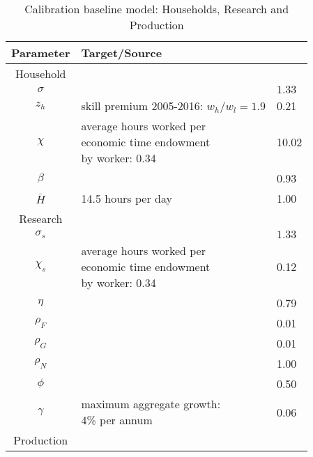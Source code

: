  \begin{table}[h!]
 	\begin{center}
 		\captionsetup{width=0.9\textwidth}
 		\caption{ Calibration baseline model: Households, Research and Production}
 		\label{tab:calib}
 		\begin{tabular}{c|ll}
 			\hline \hline
 			Parameter& Target/Source& \makecell[l]{Calibration}\\ 
 			\hline
 			\hline
 			Household&\multicolumn{2}{c}{}\\
 			\hline 
 			
 			\hline
 			$\sigma$ &  \makecell[l]{\cite{Chetty2011AreMargins}}& $1.33$  \\
 			$z_h$& \makecell[l]{skill premium 2005-2016:\\ $w_h/w_l=1.9$\\ \citep{Slavik2020WagePremium}}&0.21\\	
 			$\chi$ &  \makecell[l]{average hours worked per\\ economic time endowment\\ by worker: 0.34 \cite{OECDHoursworked}}& 10.02 \\
 			$\beta$ &  \makecell[l]{\cite{Barrage2019OptimalPolicy}}& 0.93 \\
 			$\bar{H}$& \makecell[l]{14.5 hours per day\\ \cite{Jones1993OptimalGrowth}}&1.00 \\
 			\hline
 			\hline
 			Research&\multicolumn{2}{c}{}\\
 			\hline
 			
 			\hline
 			$\sigma_s$ &  \makecell[l]{\cite{Chetty2011AreMargins}}& $1.33$\\
 			$\chi_s$ &\makecell[l]{average hours worked per \\ economic time endowment\\ by worker: 0.34 \citep{OECDHoursworked}} & 0.12 \\
 			$\eta$ & & 0.79 \\
 			$\rho_F$ & & 0.01 \\
 			$\rho_G$ &\makecell[l]{\cite{Fried2018ClimateAnalysis}} & 0.01 \\
 			$\rho_N$ & & 1.00 \\
 			$\phi$ && 0.50 \\
 			$\gamma$ &\makecell[l]{maximum aggregate growth:\\4\% per annum} & 0.06\\
 			\hline
 			\hline
 			Production&\multicolumn{2}{c}{}\\
 			\hline
 			

\end{tabular}
\end{center}
\end{table}
